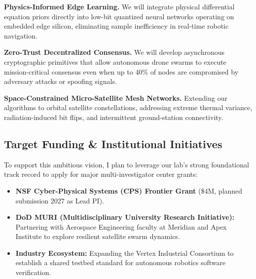 \documentclass[11pt, a4paper, parskip=half]{scrartcl}
\begin{document}
\begin{tcolorbox}[colframe=SecondaryTeal, title=Vision 2026--2031: Next-Generation Swarm Intelligence]
\begin{description}[font=\sffamily\bfseries\color{PrimaryNavy}]
  \item[Years 1--2 (Near-Term):] \textbf{Physics-Informed Edge Learning.} We will integrate physical differential equation priors directly into low-bit quantized neural networks operating on embedded edge silicon, eliminating sample inefficiency in real-time robotic navigation.
  \item[Years 3--4 (Mid-Term):] \textbf{Zero-Trust Decentralized Consensus.} We will develop asynchronous cryptographic primitives that allow autonomous drone swarms to execute mission-critical consensus even when up to 40\% of nodes are compromised by adversary attacks or spoofing signals.
  \item[Year 5 (Long-Term Horizon):] \textbf{Space-Constrained Micro-Satellite Mesh Networks.} Extending our algorithms to orbital satellite constellations, addressing extreme thermal variance, radiation-induced bit flips, and intermittent ground-station connectivity.
\end{description}
\end{tcolorbox}

\subsection{Target Funding \& Institutional Initiatives}
To support this ambitious vision, I plan to leverage our lab's strong foundational track record to apply for major multi-investigator center grants:
\begin{itemize}
  \item \textbf{NSF Cyber-Physical Systems (CPS) Frontier Grant} (\$4M, planned submission 2027 as Lead PI).
  \item \textbf{DoD MURI (Multidisciplinary University Research Initiative):} Partnering with Aerospace Engineering faculty at Meridian and Apex Institute to explore resilient satellite swarm dynamics.
  \item \textbf{Industry Ecosystem:} Expanding the Vertex Industrial Consortium to establish a shared testbed standard for autonomous robotics software verification.
\end{itemize}

\end{document}
